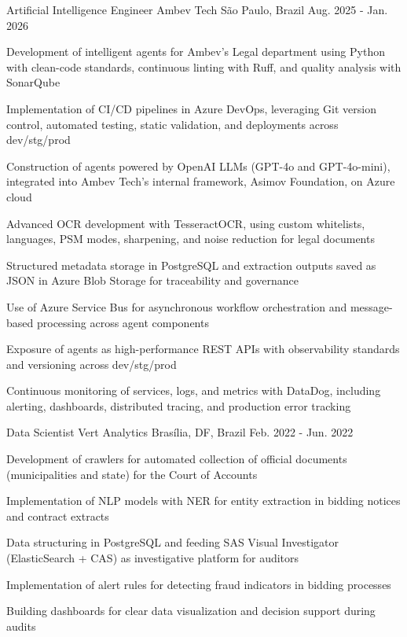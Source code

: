 \begin{cventries}
  \cventry
    {Artificial Intelligence Engineer} %
    {Ambev Tech} %
    {São Paulo, Brazil} %
    {Aug. 2025 - Jan. 2026} %
    {
      \begin{cvitems} %
        \item {Development of intelligent agents for Ambev's Legal department using Python with clean-code standards, continuous linting with Ruff, and quality analysis with SonarQube}
        \item {Implementation of CI/CD pipelines in Azure DevOps, leveraging Git version control, automated testing, static validation, and deployments across dev/stg/prod}
        \item {Construction of agents powered by OpenAI LLMs (GPT-4o and GPT-4o-mini), integrated into Ambev Tech's internal framework, Asimov Foundation, on Azure cloud}
        \item {Advanced OCR development with TesseractOCR, using custom whitelists, languages, PSM modes, sharpening, and noise reduction for legal documents}
        \item {Structured metadata storage in PostgreSQL and extraction outputs saved as JSON in Azure Blob Storage for traceability and governance}
        \item {Use of Azure Service Bus for asynchronous workflow orchestration and message-based processing across agent components}
        \item {Exposure of agents as high-performance REST APIs with observability standards and versioning across dev/stg/prod}
        \item {Continuous monitoring of services, logs, and metrics with DataDog, including alerting, dashboards, distributed tracing, and production error tracking}
      \end{cvitems}
    }

  \cventry
    {Data Scientist} %
    {Vert Analytics} %
    {Brasília, DF, Brazil} %
    {Feb. 2022 - Jun. 2022} %
    {
      \begin{cvitems} %
        \item {Development of crawlers for automated collection of official documents (municipalities and state) for the Court of Accounts}
        \item {Implementation of NLP models with NER for entity extraction in bidding notices and contract extracts}
        \item {Data structuring in PostgreSQL and feeding SAS Visual Investigator (ElasticSearch + CAS) as investigative platform for auditors}
        \item {Implementation of alert rules for detecting fraud indicators in bidding processes}
        \item {Building dashboards for clear data visualization and decision support during audits}
      \end{cvitems}
    }


\end{cventries}
